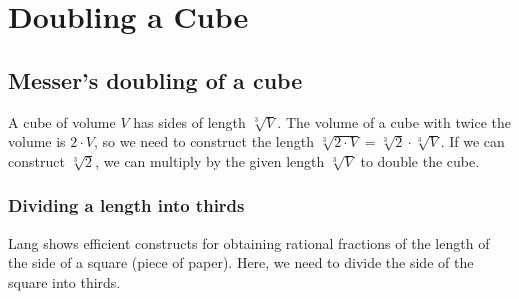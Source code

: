 
\chapter{Doubling a Cube}\label{c.cube}

\section{Messer's doubling of a cube}\label{s.cube1}

A cube of volume $V$ has sides of length $\sqrt[3]{V}$. The volume of a cube with twice the volume is $2\cdot V$, so we need to construct the length $\sqrt[3]{2\cdot V}=\sqrt[3]{2}\cdot \sqrt[3]{V}$. If we can construct $\sqrt[3]{2}$, we can multiply by the given length $\sqrt[3]{V}$ to double the cube.

\subsection{Dividing a length into thirds}

Lang \cite{lang} shows efficient constructs for obtaining rational fractions of the length of the side of a square (piece of paper). Here, we need to divide the side of the square into thirds.

